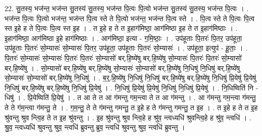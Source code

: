 \documentclass[17pt]{extarticle}
\begin{document}
22. सु॒तस्य॒ भज॑न्त॒ भज॑न्त सु॒तस्य॑ सु॒तस्य॒ भज॑न्त पि॒त्वः पि॒त्वो भज॑न्त सु॒तस्य॑ सु॒तस्य॒ भज॑न्त पि॒त्वः । . भज॑न्त पि॒त्वः पि॒त्वो भज॑न्त॒ भज॑न्त पि॒त्व स्ते ते पि॒त्वो भज॑न्त॒ भज॑न्त पि॒त्व स्ते । . पि॒त्व स्ते ते पि॒त्वः पि॒त्व स्त इ॒हे ह ते पि॒त्वः पि॒त्व स्त इ॒ह । . त इ॒हे ह ते त इ॒हाग॑मिष्ठा॒ आग॑मिष्ठा इ॒ह ते त इ॒हाग॑मिष्ठाः । . इ॒हाग॑मिष्ठा॒ आग॑मिष्ठा इ॒हे हाग॑मिष्ठाः । . आग॑मिष्ठा॒ इत्या - ग॒मि॒ष्ठाः॒ । . उप॑हूताः पि॒तरः॑ पि॒तर॒ उप॑हूता॒ उप॑हूताः पि॒तरः॑ सो॒म्यासः॑ सो॒म्यासः॑ पि॒तर॒ उप॑हूता॒ उप॑हूताः पि॒तरः॑ सो॒म्यासः॑ । . उप॑हूता॒ इत्युप॑ - हू॒ताः॒ । . पि॒तरः॑ सो॒म्यासः॑ सो॒म्यासः॑ पि॒तरः॑ पि॒तरः॑ सो॒म्यासो॑ बर्.हि॒ष्ये॑षु बर्.हि॒ष्ये॑षु सो॒म्यासः॑ पि॒तरः॑ पि॒तरः॑ सो॒म्यासो॑ बर्.हि॒ष्ये॑षु । . सो॒म्यासो॑ बर्.हि॒ष्ये॑षु बर्.हि॒ष्ये॑षु सो॒म्यासः॑ सो॒म्यासो॑ बर्.हि॒ष्ये॑षु नि॒धिषु॑ नि॒धिषु॑ बर्.हि॒ष्ये॑षु सो॒म्यासः॑ सो॒म्यासो॑ बर्.हि॒ष्ये॑षु नि॒धिषु॑ । . ब॒र्॒.हि॒ष्ये॑षु नि॒धिषु॑ नि॒धिषु॑ बर्.हि॒ष्ये॑षु बर्.हि॒ष्ये॑षु नि॒धिषु॑ प्रि॒येषु॑ प्रि॒येषु॑ नि॒धिषु॑ बर्.हि॒ष्ये॑षु बर्.हि॒ष्ये॑षु नि॒धिषु॑ प्रि॒येषु॑ । . नि॒धिषु॑ प्रि॒येषु॑ प्रि॒येषु॑ नि॒धिषु॑ नि॒धिषु॑ प्रि॒येषु॑ । . नि॒धिष्विति॑ नि - धिषु॑ । . प्रि॒येष्विति॑ प्रि॒येषु॑ । . त आ ते त आ ग॑मन्तु गम॒न्त्वा ते त आ ग॑मन्तु । . आ ग॑मन्तु गम॒न्त्वा ग॑मन्तु॒ ते ते ग॑म॒न्त्वा ग॑मन्तु॒ ते । . ग॒म॒न्तु॒ ते ते ग॑मन्तु गमन्तु॒ त इ॒हे ह ते ग॑मन्तु गमन्तु॒ त इ॒ह । . त इ॒हे ह ते त इ॒ह श्रु॑वन्तु श्रुव न्त्वि॒ह ते त इ॒ह श्रु॑वन्तु । . इ॒ह श्रु॑वन्तु श्रुव न्त्वि॒हे ह श्रु॑व॒ न्त्वध्यधि॑ श्रुवन्त्वि॒हे ह श्रु॑व॒ न्त्वधि॑ । . श्रु॒व॒ न्त्वध्यधि॑ श्रुवन्तु श्रुव॒ न्त्वधि॑ ब्रुवन्तु ब्रुव॒ न्त्वधि॑ श्रुवन्तु श्रुव॒ न्त्वधि॑ ब्रुवन्तु । \newline
\end{document}
